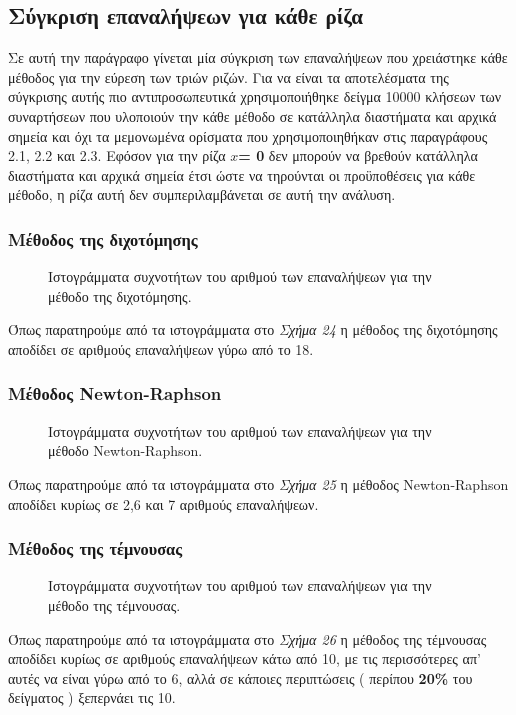 \documentclass[First Project.tex]{subfiles}
\begin{document}
\subsection{ Σύγκριση επαναλήψεων για κάθε ρίζα }
Σε αυτή την παράγραφο γίνεται μία σύγκριση των επαναλήψεων που χρειάστηκε κάθε μέθοδος για την εύρεση των
τριών ριζών. Για  να είναι τα αποτελέσματα της σύγκρισης αυτής πιο αντιπροσωπευτικά χρησιμοποιήθηκε δείγμα 10000 κλήσεων των συναρτήσεων που υλοποιούν την κάθε μέθοδο
σε κατάλληλα διαστήματα και αρχικά σημεία και όχι τα μεμονωμένα ορίσματα που χρησιμοποιηθήκαν στις παραγράφους 2.1, 2.2 και 2.3. Εφόσον για την ρίζα \textlatin{\textbf{$x$= 0}} δεν μπορούν να βρεθούν κατάλληλα διαστήματα
και αρχικά σημεία έτσι ώστε να τηρούνται οι προϋποθέσεις για κάθε μέθοδο, η ρίζα αυτή δεν συμπεριλαμβάνεται σε αυτή την ανάλυση.
\subsubsection{\textbf{Μέθοδος της διχοτόμησης}}
\vspace{5mm}
\begin{figure}[h!]
    \centering
    \quad
    \caption{ Ιστογράμματα συχνοτήτων του αριθμού των επαναλήψεων για την μέθοδο της διχοτόμησης. }
\end{figure}
Όπως παρατηρούμε από τα ιστογράμματα στο \textit{Σχήμα 24} η μέθοδος της διχοτόμησης αποδίδει σε αριθμούς επαναλήψεων γύρω από το 18.
\subsubsection{\textbf{Μέθοδος \textlatin{Newton-Raphson}}}
\vspace{5mm}
\begin{figure}[h!]
    \centering
    \quad
    \caption{ Ιστογράμματα συχνοτήτων του αριθμού των επαναλήψεων για την μέθοδο \textlatin{Newton-Raphson}. }
\end{figure}
Όπως παρατηρούμε από τα ιστογράμματα στο \textit{Σχήμα 25} η μέθοδος \textlatin{Newton-Raphson} αποδίδει κυρίως σε 2,6 και
7 αριθμούς επαναλήψεων.
\newpage
\subsubsection{\textbf{Μέθοδος της τέμνουσας}}
\begin{figure}[h!]
    \centering
    \quad
    \caption{ Ιστογράμματα συχνοτήτων του αριθμού των επαναλήψεων για την μέθοδο της τέμνουσας. }
\end{figure}
Όπως παρατηρούμε από τα ιστογράμματα στο \textit{Σχήμα 26} η μέθοδος της τέμνουσας αποδίδει κυρίως σε αριθμούς επαναλήψεων κάτω από 10, με τις
περισσότερες απ' αυτές να είναι γύρω από το 6, αλλά σε κάποιες περιπτώσεις ( περίπου \textbf{20\%} του δείγματος ) ξεπερνάει τις 10.
\end{document}
